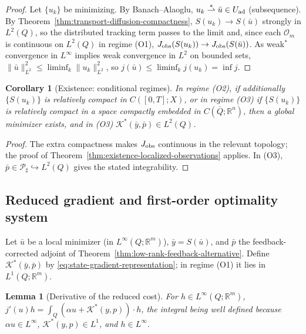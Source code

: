 \documentclass[pdflatex,sn-mathphys-num]{sn-jnl}
\theoremstyle{plain}
\newtheorem{lemma}[theorem]{Lemma}
\newtheorem{corollary}[theorem]{Corollary}
\theoremstyle{definition}
\theoremstyle{remark}
\newcommand{\R}{\mathbb R}
\begin{document}
\begin{proof}
Let $\{u_k\}$ be minimizing. By Banach--Alaoglu,
$u_k\overset{\ast}{\rightharpoonup}\bar u\in U_{\rm ad}$ (subsequence). By
Theorem~\ref{thm:transport-diffusion-compactness}, $S(u_k)\to S(\bar u)$
strongly in $L^2(Q)$, so the distributed tracking term passes to the limit and,
since each $\mathcal O_m$ is continuous on $L^2(Q)$ in regime (O1),
$J_{\rm obs}(S(u_k))\to J_{\rm obs}(S(\bar u))$. As weak$^\ast$ convergence in
$L^\infty$ implies weak convergence in $L^2$ on bounded sets,
$\|\bar u\|_{L^2}^2\le\liminf_k\|u_k\|_{L^2}^2$, so
$j(\bar u)\le\liminf_k j(u_k)=\inf j$.
\end{proof}

\begin{corollary}[Existence: conditional regimes]
\label{cor:existence-point}
In regime (O2), if additionally $\{S(u_k)\}$ is relatively compact in
$C([0,T];X)$, or in regime (O3) if $\{S(u_k)\}$ is relatively compact in a
space compactly embedded in $C(\overline Q;\R^n)$, then a global minimizer
exists, and in (O3) $\mathcal K^*(\bar y,\bar p)\in L^2(Q)$.
\end{corollary}

\begin{proof}
The extra compactness makes $J_{\rm obs}$ continuous in the relevant topology;
the proof of Theorem~\ref{thm:existence-localized-observations} applies. In
(O3), $\bar p\in\mathcal P_\sharp\hookrightarrow L^2(Q)$ gives the stated
integrability.
\end{proof}

\subsection{Reduced gradient and first-order optimality system}
\label{subsec:gradient-first-order}
Let $\bar u$ be a local minimizer (in $L^\infty(Q;\R^m)$), $\bar y=S(\bar u)$,
and $\bar p$ the feedback-corrected adjoint of
Theorem~\ref{thm:low-rank-feedback-alternative}. Define
$\mathcal K^*(\bar y,\bar p)$ by \eqref{eq:state-gradient-representation}; in
regime (O1) it lies in $L^1(Q;\R^m)$.

\begin{lemma}[Derivative of the reduced cost]
\label{lem:reduced-gradient-section4}
For $h\in L^\infty(Q;\R^m)$,
$\displaystyle j'(u)h
=
\int_Q
\left(
\alpha u+\mathcal K^*(y,p)
\right)\cdot h $,
the integral being well defined because $\alpha u\in L^\infty$,
$\mathcal K^*(y,p)\in L^1$, and $h\in L^\infty$.
\end{lemma}
\end{document}
